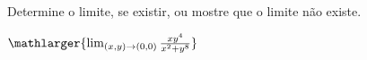 Determine o limite, se existir, ou mostre que o limite não existe.

$\mathlarger{\lim_{(x,y)\rightarrow(0,0)} \frac{xy^4}{x^2+y^8}}$
